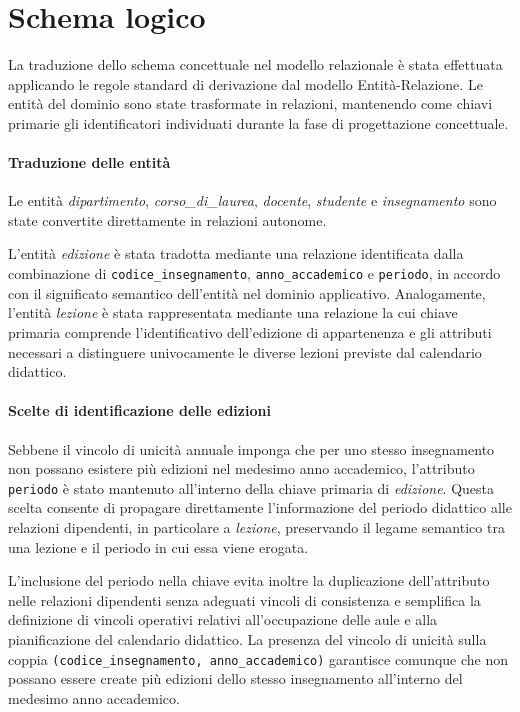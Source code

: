 \section{Schema logico}
\label{sec:schema-logico}

La traduzione dello schema concettuale nel modello relazionale è stata effettuata applicando le regole standard di derivazione dal modello Entità-Relazione.
Le entità del dominio sono state trasformate in relazioni, mantenendo come chiavi primarie gli identificatori individuati durante la fase di progettazione concettuale.

\paragraph{Traduzione delle entità}
Le entità \textit{dipartimento}, \textit{corso\_di\_laurea}, \textit{docente}, \textit{studente} e \textit{insegnamento} sono state convertite direttamente in relazioni autonome.

L'entità \textit{edizione} è stata tradotta mediante una relazione identificata dalla combinazione di \texttt{codice\_insegnamento}, \texttt{anno\_accademico} e \texttt{periodo}, in accordo con il significato semantico dell'entità nel dominio applicativo. Analogamente, l'entità \textit{lezione} è stata rappresentata mediante una relazione la cui chiave primaria comprende l'identificativo dell'edizione di appartenenza e gli attributi necessari a distinguere univocamente le diverse lezioni previste dal calendario didattico.

\paragraph{Scelte di identificazione delle edizioni}
Sebbene il vincolo di unicità annuale imponga che per uno stesso insegnamento non possano esistere più edizioni nel medesimo anno accademico, l'attributo \texttt{periodo} è stato mantenuto all'interno della chiave primaria di \textit{edizione}. Questa scelta consente di propagare direttamente l'informazione del periodo didattico alle relazioni dipendenti, in particolare a \textit{lezione}, preservando il legame semantico tra una lezione e il periodo in cui essa viene erogata.

L'inclusione del periodo nella chiave evita inoltre la duplicazione dell'attributo nelle relazioni dipendenti senza adeguati vincoli di consistenza e semplifica la definizione di vincoli operativi relativi all'occupazione delle aule e alla pianificazione del calendario didattico. La presenza del vincolo di unicità sulla coppia \texttt{(codice\_insegnamento, anno\_accademico)} garantisce comunque che non possano essere create più edizioni dello stesso insegnamento all'interno del medesimo anno accademico.

